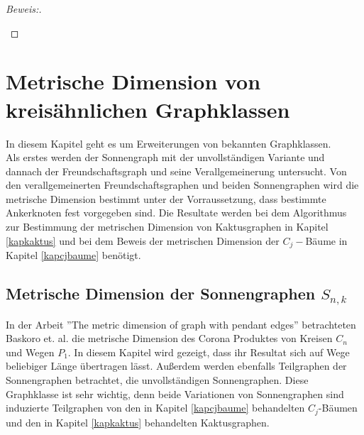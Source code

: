 \begin{proof}[Beweis:]
\begin{enumerate}
\begin{itemize}
\end{itemize}
\end{enumerate}
\end{proof}
\chapter{Metrische Dimension von kreisähnlichen Graphklassen}
\vspace{-5mm}
In diesem Kapitel geht es um Erweiterungen von bekannten Graphklassen.\\Als erstes werden der Sonnengraph mit der unvollständigen Variante und dannach der Freundschaftsgraph und seine Verallgemeinerung untersucht.
Von den verallgemeinerten Freundschaftsgraphen und beiden Sonnengraphen wird die metrische Dimension bestimmt unter der Vorraussetzung, dass bestimmte Ankerknoten fest vorgegeben sind. Die Resultate werden bei dem Algorithmus zur Bestimmung der metrischen Dimension von Kaktusgraphen in Kapitel \ref{kapkaktus} und bei dem Beweis der metrischen Dimension der $C_j-$Bäume in Kapitel \ref{kapcjbaume} benötigt.
\vspace{-4mm}
\section{Metrische Dimension der Sonnengraphen $S_{n,k}$}
\label{chap_sonne}
In der Arbeit ''The metric dimension of graph with pendant edges'' \cite{sun} betrachteten Baskoro et. al. die metrische Dimension des Corona Produktes von Kreisen $C_n$ und Wegen $P_1$. In diesem Kapitel wird gezeigt, dass ihr Resultat sich auf Wege beliebiger Länge übertragen lässt. Außerdem werden ebenfalls Teilgraphen der Sonnengraphen betrachtet, die unvollständigen Sonnengraphen. Diese Graphklasse ist sehr wichtig, denn beide Variationen von Sonnengraphen sind induzierte Teilgraphen von den in Kapitel \ref{kapcjbaume} behandelten $C_j$-Bäumen und den in Kapitel \ref{kapkaktus} behandelten Kaktusgraphen.

